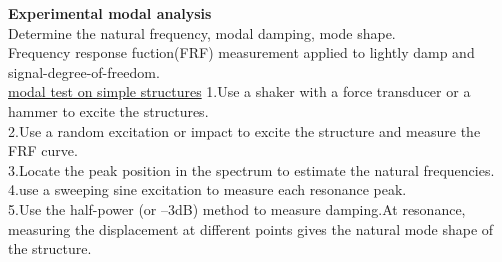 \documentclass{article}
\begin{document}
\begin{multicols*}{3}
\noindent\textbf{Experimental modal analysis}\\
Determine the natural frequency, modal damping, mode shape.\\
Frequency response fuction(FRF) measurement applied to lightly damp and signal-degree-of-freedom.\\
\underline{modal test on simple structures}
1.Use a shaker with a force transducer or a hammer to excite the structures.\\
2.Use a random excitation or impact to excite the structure and measure the FRF curve.\\
3.Locate the peak position in the spectrum to estimate the natural frequencies.\\
4.use a sweeping sine excitation to measure each resonance peak.\\
5.Use the half-power (or –3dB) method to measure damping.At resonance, measuring the displacement at different points gives the natural mode shape of the structure.\\

 



\end{multicols*}
\end{document}
